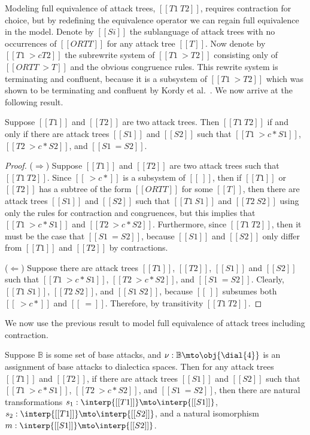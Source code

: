 Modeling full equivalence of attack trees, $[[T1 ~ T2]]$, requires
contraction for choice, but by redefining the equivalence operator we
can regain full equivalence in the model.  Denote by $[[Si]]$ the
sublanguage of attack trees with no occurrences of $[[OR T T]]$ for
any attack tree $[[T]]$.  Now denote by $[[T1 ~>c T2]]$ the subrewrite
system of $[[T1 ~> T2]]$ consisting only of $[[OR T T ~> T]]$ and the
obvious congruence rules.  This rewrite system is terminating and
confluent, because it is a subsystem of $[[T1 ~> T2]]$ which was shown
to be terminating and confluent by Kordy et al.~\cite{Kordy2017}.  We
now arrive at the following result.
\begin{lemma}
  \label{lemma:new-equivalence-atrees}
  Suppose $[[T1]]$ and $[[T2]]$ are two attack trees.  Then $[[T1 ~
      T2]]$ if and only if there are attack trees $[[S1]]$ and
  $[[S2]]$ such that $[[T1 ~>c* S1]]$, $[[T2 ~>c* S2]]$, and $[[S1 ~=
      S2]]$.
\end{lemma}
\begin{proof}
  ($\Rightarrow$) Suppose $[[T1]]$ and $[[T2]]$ are two attack trees
  such that $[[T1 ~ T2]]$.  Since $[[~>c*]]$ is a subsystem of
  $[[~]]$, then if $[[T1]]$ or $[[T2]]$ has a subtree of the form
  $[[OR T T]]$ for some $[[T]]$, then there are attack trees $[[S1]]$
  and $[[S2]]$ such that $[[T1 ~ S1]]$ and $[[T2 ~ S2]]$ using only
  the rules for contraction and congruences, but this implies that
  $[[T1 ~>c* S1]]$ and $[[T2 ~>c* S2]]$.  Furthermore, since $[[T1 ~
      T2]]$, then it must be the case that $[[S1 ~= S2]]$, because
  $[[S1]]$ and $[[S2]]$ only differ from $[[T1]]$ and $[[T2]]$ by
  contractions.

  \noindent
  ($\Leftarrow$) Suppose there are attack trees $[[T1]]$, $[[T2]]$,
  $[[S1]]$ and $[[S2]]$ such that $[[T1 ~>c* S1]]$, $[[T2 ~>c* S2]]$,
  and $[[S1 ~= S2]]$.  Clearly, $[[T1 ~ S1]]$, $[[T2 ~ S2]]$, and
  $[[S1 ~ S2]]$, because $[[~]]$ subsumes both $[[~>c*]]$ and
  $[[~=]]$.  Therefore, by transitivity $[[T1 ~ T2]]$.
\end{proof}
We now use the previous result to model full equivalence of attack
trees including contraction.
\begin{theorem}
  \label{lemma:equivalence_of_attack_trees_in_the_dialectica_semantics}
  Suppose $\mathbb{B}$ is some set of base attacks, and $\nu :
  \mathbb{B} \mto \obj{\dial{4}}$ is an assignment of base attacks to
  dialectica spaces.  Then for any attack trees $[[T1]]$ and $[[T2]]$,
  if there are attack trees $[[S1]]$ and $[[S2]]$ such that $[[T1 ~>c*
      S1]]$, $[[T2 ~>c* S2]]$, and $[[S1 ~= S2]]$, then there are
  natural transformations $s_1 : \interp{[[T1]]} \mto
  \interp{[[S1]]}$, $s_2 : \interp{[[T1]]} \mto \interp{[[S2]]}$, and
  a natural isomorphism $m : \interp{[[S1]]} \mto \interp{[[S2]]}$.
\end{theorem}


